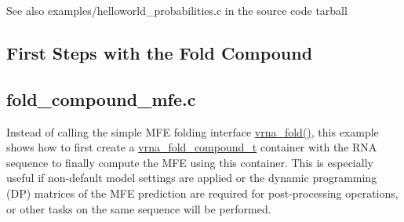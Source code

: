 \begin{DoxyCodeInclude}{0}
\DoxyCodeLine{}
\DoxyCodeLine{  \textcolor{comment}{/* cleanup memory */}}
\DoxyCodeLine{}
\DoxyCodeLine{\}}
\end{DoxyCodeInclude}
 \begin{DoxySeeAlso}{See also}
{\ttfamily examples/helloworld\+\_\+probabilities.\+c} in the source code tarball
\end{DoxySeeAlso}
\hypertarget{examples_c_ex_c_fc}{}\subsection{First Steps with the Fold Compound}\label{examples_c_ex_c_fc}
\subsection*{fold\+\_\+compound\+\_\+mfe.\+c }

Instead of calling the simple M\+FE folding interface \mbox{\hyperlink{group__mfe__global_ga29a33b2895f4e67b0480271ff289afdc}{vrna\+\_\+fold()}}, this example shows how to first create a \mbox{\hyperlink{group__fold__compound_ga1b0cef17fd40466cef5968eaeeff6166}{vrna\+\_\+fold\+\_\+compound\+\_\+t}} container with the R\+NA sequence to finally compute the M\+FE using this container. This is especially useful if non-\/default model settings are applied or the dynamic programming (DP) matrices of the M\+FE prediction are required for post-\/processing operations, or other tasks on the same sequence will be performed.


